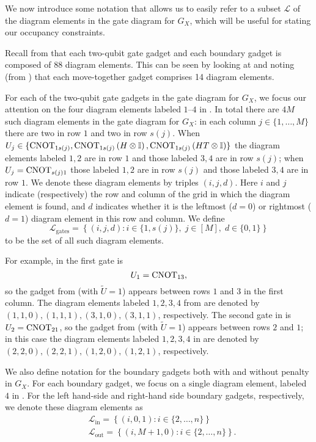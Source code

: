 \documentclass[../thesis-main/thesis-main]{subfiles}
\begin{document}
We now introduce some notation that allows us to easily refer to a subset $\mathcal{L}$ of the diagram elements in the gate diagram for $G_X$, which will be useful for stating our occupancy constraints.

Recall from  that each two-qubit gate gadget and each boundary gadget is composed of $88$ diagram elements. This can be seen by looking at  and noting (from ) that each move-together gadget comprises 14 diagram elements.

For each of the two-qubit gate gadgets in the gate diagram for $G_X$, we focus our attention on the four diagram elements labeled $1$--$4$ in . In total there are $4M$ such diagram elements in the gate diagram for $G_X$: in each column $j\in\{1,\ldots,M\}$ there are two in row $1$ and two in row $s(j)$. When $U_j\in\{\mathrm{CNOT}_{1s(j)},\mathrm{CNOT}_{1s(j)}\left(H\otimes\mathbb{I}\right),\mathrm{CNOT}_{1s(j)}\left(HT\otimes\mathbb{I}\right)\}$ the diagram elements labeled $1,2$ are in row $1$ and those labeled $3,4$ are in row $s(j)$; when $U_j=\mathrm{CNOT}_{s(j) 1}$ those labeled $1,2$ are in row $s(j)$ and those labeled $3,4$ are in row $1$. We denote these diagram elements by triples $(i,j,d)$. Here $i$ and $j$ indicate (respectively) the row and column of the grid in which the diagram element is found, and $d$ indicates whether it is the leftmost ($d=0$) or rightmost ($d=1$) diagram element in this row and column. We define 
\begin{equation}
\mathcal{L}_{\mathrm{gates}}=\left\{ \left(i,j,d\right)\colon i\in\{1,s(j)\},\; j\in[M],\; d\in\{0,1\}\right\} \label{eq:L_gates}
\end{equation}
to be the set of all such diagram elements.

For example, in  the first gate is 
\begin{equation}
  U_1=\mathrm{CNOT}_{13},
\end{equation}
so the gadget from  (with $\tilde U=1$) appears between rows $1$ and $3$ in the first column. The diagram elements labeled $1,2,3,4$ from  are denoted by $(1,1,0), (1,1,1), (3,1,0), (3,1,1)$, respectively. The second gate in  is $U_2=\mathrm{CNOT}_{21}$, so the gadget from  (with $\tilde U=1$) appears between rows $2$ and $1$; in this case the diagram elements labeled $1,2,3,4$ in  are denoted by $(2,2,0),(2,2,1),(1,2,0),(1,2,1)$, respectively.

We also define notation for the boundary gadgets both with and without penalty in $G_X$. For each boundary gadget, we focus on a single diagram element, labeled $4$ in . For the left hand-side and right-hand side boundary gadgets, respectively, we denote these diagram elements as
\begin{align}
 & \mathcal{L}_{\text{in}}=\left\{ (i,0,1)\colon i\in\{2,\ldots,n\}\right\} \label{eq:L_in}\\
 & \mathcal{L}_{\text{out}}=\left\{ (i,M+1,0)\colon i\in\{2,\ldots,n\}\right\} .\label{eq:L_out}
\end{align}
 
\end{document}
